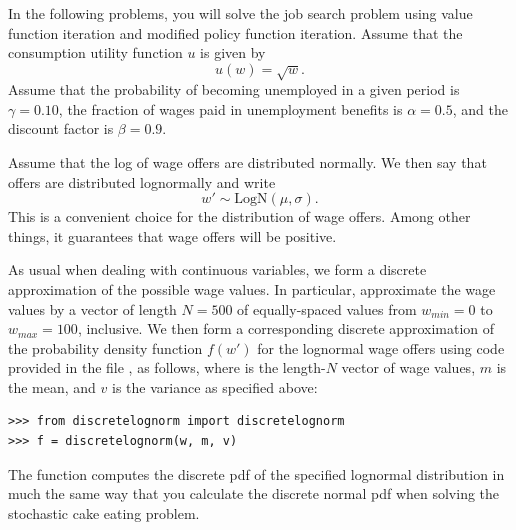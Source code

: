 In the following problems, you will solve the job search problem using value function iteration and modified policy 
function iteration. Assume that the consumption utility function $u$ is given by
\[
u(w) = \sqrt{w}.
\]
Assume that the probability of becoming unemployed in a given period is $\gamma = 0.10$, the fraction of wages paid
in unemployment benefits is $\alpha = 0.5$, and the discount factor is $\beta = 0.9$. 

Assume that the log of wage offers are distributed normally.  We then say that offers are distributed 
lognormally and write
\[
w'\sim \text{LogN}(\mu,\sigma).
\]
This is a convenient choice for the distribution of
wage offers.  Among other things, it guarantees that wage offers will be positive.

As usual when dealing with continuous variables, we form a discrete approximation of 
the possible wage values. In particular, approximate the wage values by a vector of
length $N = 500$ of equally-spaced values from $w_{min} = 0$ to $w_{max} = 100$, inclusive.
We then form a corresponding discrete approximation of the probability density function 
$f(w')$ for the lognormal wage offers using code provided in the file ,
as follows, where  is the length-$N$ vector of wage values, $m$ is the mean, and $v$ is 
the variance as specified above:
\begin{lstlisting}
>>> from discretelognorm import discretelognorm
>>> f = discretelognorm(w, m, v)
\end{lstlisting}
The function  computes the discrete pdf of the specified lognormal distribution in much
the same way that you calculate the discrete normal pdf when solving the stochastic cake eating problem.



